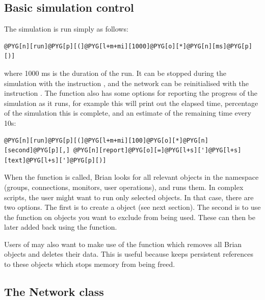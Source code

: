 \documentclass[letterpaper,10pt,english]{manual}
\begin{document}
\subsection{Basic simulation control}

The simulation is run simply as follows:

\begin{Verbatim}[commandchars=@\[\]]
@PYG[n][run]@PYG[p][(]@PYG[l+m+mi][1000]@PYG[o][*]@PYG[n][ms]@PYG[p][)]
\end{Verbatim}

where 1000 ms is the duration of the run. It can be stopped during the simulation with the instruction
\hyperlink{brian.stop}{}, and the network can be reinitialised with the instruction \hyperlink{brian.reinit}{}.
The \hyperlink{brian.run}{} function also has some options for reporting the progress of the
simulation as it runs, for example this will print out the elapsed time,
percentage of the simulation this is complete, and an estimate of the
remaining time every 10s:

\begin{Verbatim}[commandchars=@\[\]]
@PYG[n][run]@PYG[p][(]@PYG[l+m+mi][100]@PYG[o][*]@PYG[n][second]@PYG[p][,] @PYG[n][report]@PYG[o][=]@PYG[l+s][']@PYG[l+s][text]@PYG[l+s][']@PYG[p][)]
\end{Verbatim}

When the \hyperlink{brian.run}{} function is called, Brian looks for all relevant
objects in the namespace (groups, connections, monitors, user operations), and runs them.
In complex scripts, the user might want to run only selected objects. In that
case, there are two options. The first is to create a \hyperlink{brian.Network}{} object
(see next section). The second is to use the \hyperlink{brian.forget}{} function on objects
you want to exclude from being used. These can then be later added back using
the \hyperlink{brian.recall}{} function.

Users of  may also want to make use of the \hyperlink{brian.clear}{} function which removes all Brian objects
and deletes their data. This is useful because  keeps persistent references to these objects
which stops memory from being freed.


\subsection{The Network class}
\end{document}
